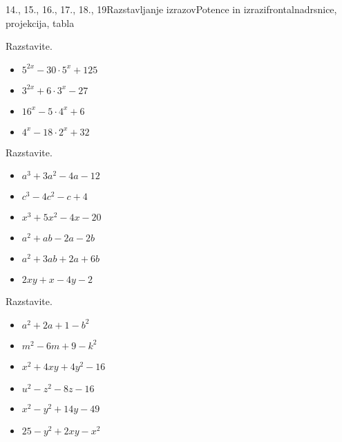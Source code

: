 \begin{priprava}{14., 15., 16., 17., 18., 19}{}{Razstavljanje izrazov}{Potence in izrazi}{frontalna}{drsnice, projekcija, tabla}
\begin{multicols}{2}
    
        
            \begin{naloga}
                Razstavite.
                \begin{itemize}
                    \item $5^{2x}-30\cdot 5^x+125$ 
                    \item $3^{2x}+6\cdot 3^x-27$ 
                    \item $16^x-5\cdot 4^x+6$ 
                    \item $4^x-18\cdot 2^x+32$ 
                \end{itemize}
            \end{naloga}
        
    
        
            \begin{naloga}
                Razstavite.
                \begin{itemize}
                    \item $a^3+3a^2-4a-12$ 
                    \item $c^3-4c^2-c+4$ 
                    \item $x^3+5x^2-4x-20$ 
                    \item $a^2+ab-2a-2b$ 
                    \item $a^2+3ab+2a+6b$ 
                    \item $2xy+x-4y-2$ 
                \end{itemize}
            \end{naloga}
        
    
        
            \begin{naloga}
                Razstavite.
                \begin{itemize}
                    \item $a^2+2a+1-b^2$ 
                    \item $m^2-6m+9-k^2$ 
                    \item $x^2+4xy+4y^2-16$ 
                    \item $u^2-z^2-8z-16$ 
                    \item $x^2-y^2+14y-49$ 
                    \item $25-y^2+2xy-x^2$ 
                \end{itemize}
            \end{naloga}
        
    
        

\end{multicols}
\end{priprava}
